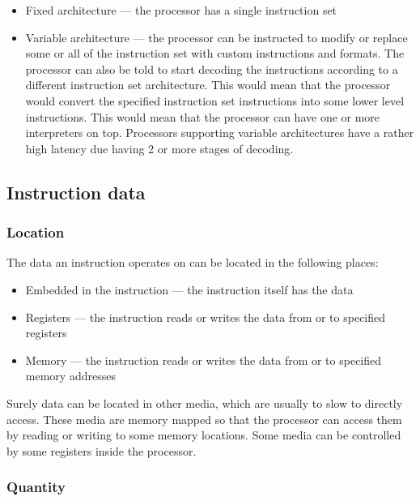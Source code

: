 \documentclass{report}
\begin{document}
\begin{itemize}
    \item{Fixed architecture --- the processor has a single instruction set}
    \item{Variable architecture --- the processor can be instructed to modify or
        replace some or all of the instruction set with custom instructions and
        formats. The processor can also be told to start decoding the
        instructions according to a different instruction set architecture.
        This would mean that the processor would convert the specified
        instruction set instructions into some lower level instructions. This
        would mean that the processor can have one or more interpreters on top.
        Processors supporting variable architectures have a rather high latency
        due having 2 or more stages of decoding.}
\end{itemize}

\subsection{Instruction data}

\subsubsection{Location}

The data an instruction operates on can be located in the following places:

\begin{itemize}
    \item{Embedded in the instruction --- the instruction itself has the data}
    \item{Registers --- the instruction reads or writes the data from or to
        specified registers}
    \item{Memory --- the instruction reads or writes the data from or to
        specified memory addresses}
\end{itemize}

Surely data can be located in other media, which are usually to slow to directly
access. These media are memory mapped so that the processor can access them by
reading or writing to some memory locations. Some media can be controlled by
some registers inside the processor.

\subsubsection{Quantity}
\end{document}
